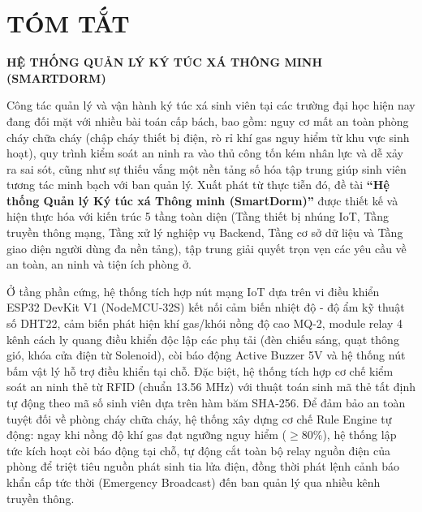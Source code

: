 \chapter*{TÓM TẮT}

\begin{center}
    {\large \bfseries HỆ THỐNG QUẢN LÝ KÝ TÚC XÁ THÔNG MINH (SMARTDORM)}\\[0.5cm]
\end{center}

Công tác quản lý và vận hành ký túc xá sinh viên tại các trường đại học hiện nay đang đối mặt với nhiều bài toán cấp bách, bao gồm: nguy cơ mất an toàn phòng cháy chữa cháy (chập cháy thiết bị điện, rò rỉ khí gas nguy hiểm từ khu vực sinh hoạt), quy trình kiểm soát an ninh ra vào thủ công tốn kém nhân lực và dễ xảy ra sai sót, cũng như sự thiếu vắng một nền tảng số hóa tập trung giúp sinh viên tương tác minh bạch với ban quản lý. Xuất phát từ thực tiễn đó, đề tài \textbf{``Hệ thống Quản lý Ký túc xá Thông minh (SmartDorm)''} được thiết kế và hiện thực hóa với kiến trúc 5 tầng toàn diện (Tầng thiết bị nhúng IoT, Tầng truyền thông mạng, Tầng xử lý nghiệp vụ Backend, Tầng cơ sở dữ liệu và Tầng giao diện người dùng đa nền tảng), tập trung giải quyết trọn vẹn các yêu cầu về an toàn, an ninh và tiện ích phòng ở.

Ở tầng phần cứng, hệ thống tích hợp nút mạng IoT dựa trên vi điều khiển ESP32 DevKit V1 (NodeMCU-32S) kết nối cảm biến nhiệt độ - độ ẩm kỹ thuật số DHT22, cảm biến phát hiện khí gas/khói nồng độ cao MQ-2, module relay 4 kênh cách ly quang điều khiển độc lập các phụ tải (đèn chiếu sáng, quạt thông gió, khóa cửa điện từ Solenoid), còi báo động Active Buzzer 5V và hệ thống nút bấm vật lý hỗ trợ điều khiển tại chỗ. Đặc biệt, hệ thống tích hợp cơ chế kiểm soát an ninh thẻ từ RFID (chuẩn 13.56 MHz) với thuật toán sinh mã thẻ tất định tự động theo mã số sinh viên dựa trên hàm băm SHA-256. Để đảm bảo an toàn tuyệt đối về phòng cháy chữa cháy, hệ thống xây dựng cơ chế Rule Engine tự động: ngay khi nồng độ khí gas đạt ngưỡng nguy hiểm ($\ge 80\%$), hệ thống lập tức kích hoạt còi báo động tại chỗ, tự động cắt toàn bộ relay nguồn điện của phòng để triệt tiêu nguồn phát sinh tia lửa điện, đồng thời phát lệnh cảnh báo khẩn cấp tức thời (Emergency Broadcast) đến ban quản lý qua nhiều kênh truyền thông.

